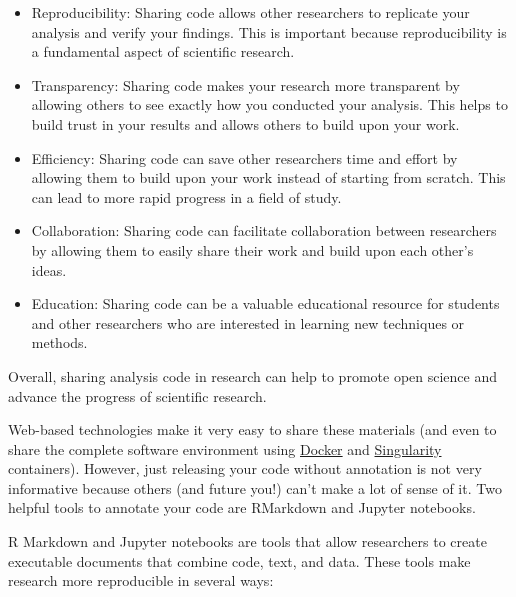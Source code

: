 \documentclass[
  letterpaper,
  DIV=11,
  numbers=noendperiod]{scrreprt}
\begin{document}
\begin{itemize}
\item
  Reproducibility: Sharing code allows other researchers to replicate
  your analysis and verify your findings. This is important because
  reproducibility is a fundamental aspect of scientific research.
\item
  Transparency: Sharing code makes your research more transparent by
  allowing others to see exactly how you conducted your analysis. This
  helps to build trust in your results and allows others to build upon
  your work.
\item
  Efficiency: Sharing code can save other researchers time and effort by
  allowing them to build upon your work instead of starting from
  scratch. This can lead to more rapid progress in a field of study.
\item
  Collaboration: Sharing code can facilitate collaboration between
  researchers by allowing them to easily share their work and build upon
  each other's ideas.
\item
  Education: Sharing code can be a valuable educational resource for
  students and other researchers who are interested in learning new
  techniques or methods.
\end{itemize}

Overall, sharing analysis code in research can help to promote open
science and advance the progress of scientific research.

Web-based technologies make it very easy to share these materials (and
even to share the complete software environment using
\href{https://www.docker.com/}{Docker} and
\href{https://sylabs.io/singularity/}{Singularity} containers). However,
just releasing your code without annotation is not very informative
because others (and future you!) can't make a lot of sense of it. Two
helpful tools to annotate your code are RMarkdown and Jupyter notebooks.

R Markdown and Jupyter notebooks are tools that allow researchers to
create executable documents that combine code, text, and data. These
tools make research more reproducible in several ways:
\end{document}
